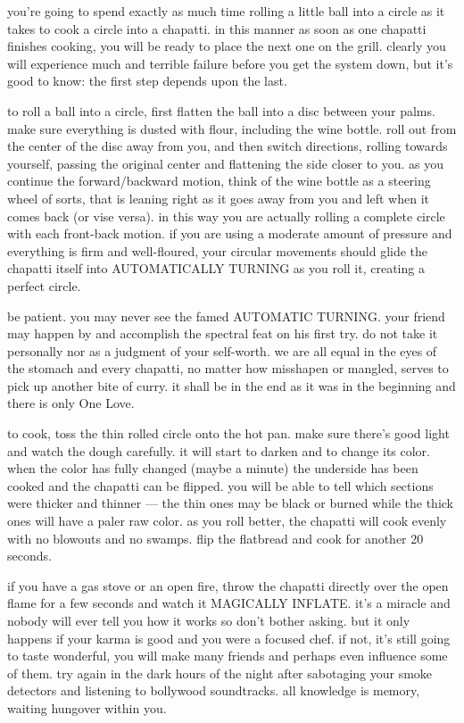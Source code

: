 you're going to spend exactly as much time rolling a little ball into a circle 
as it takes to cook a circle into a chapatti. in this manner as soon as one 
chapatti finishes cooking, you will be ready to place the next one on the 
grill. clearly you will experience much and terrible failure before you get the 
system down, but it's good to know: the first step depends upon the last.

to roll a ball into a circle, first flatten the ball into a disc between your 
palms. make sure everything is dusted with flour, including the wine bottle. 
roll out from the center of the disc away from you, and then switch directions, 
rolling towards yourself, passing the original center and flattening the side 
closer to you. as you continue the forward/backward motion, think of the wine 
bottle as a steering wheel of sorts, that is leaning right as it goes away from 
you and left when it comes back (or vise versa). in this way you are actually 
rolling a complete circle with each front-back motion. if you are using a 
moderate amount of pressure and everything is firm and well-floured, your 
circular movements should glide the chapatti itself into AUTOMATICALLY TURNING 
as you roll it, creating a perfect circle.

be patient. you may never see the famed AUTOMATIC TURNING. your friend may 
happen by and accomplish the spectral feat on his first try. do not take it 
personally nor as a judgment of your self-worth. we are all equal in the eyes 
of the stomach and every chapatti, no matter how misshapen or mangled, serves 
to pick up another bite of curry. it shall be in the end as it was in the 
beginning and there is only One Love.

to cook, toss the thin rolled circle onto the hot pan. make sure there's good 
light and watch the dough carefully. it will start to darken and to change its 
color. when the color has fully changed (maybe a minute) the underside has been 
cooked and the chapatti can be flipped. you will be able to tell which sections 
were thicker and thinner --- the thin ones may be black or burned while the 
thick ones will have a paler raw color. as you roll better, the chapatti will 
cook evenly with no blowouts and no swamps. flip the flatbread and cook for 
another 20 seconds.

if you have a gas stove or an open fire, throw the chapatti directly over the 
open flame for a few seconds and watch it MAGICALLY INFLATE. it's a miracle and 
nobody will ever tell you how it works so don't bother asking. but it only 
happens if your karma is good and you were a focused chef. if not, it's still 
going to taste wonderful, you will make many friends and perhaps even influence 
some of them. try again in the dark hours of the night after sabotaging your 
smoke detectors and listening to bollywood soundtracks. all knowledge is 
memory, waiting hungover within you.


